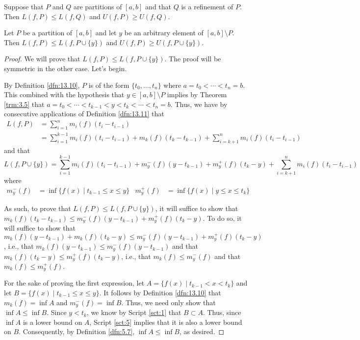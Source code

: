 \documentclass[../main.tex]{subfiles}
\begin{document}
\begin{lemma}\label{lem:13.12}
    Suppose that $P$ and $Q$ are partitions of $[a,b]$ and that $Q$ is a refinement of $P$. Then $L(f,P)\leq L(f,Q)$ and $U(f,P)\geq U(f,Q)$.
    \begin{lemma*}
        Let $P$ be a partition of $[a,b]$ and let $y$ be an arbitrary element of $[a,b]\setminus P$. Then $L(f,P)\leq L(f,P\cup\{y\})$ and $U(f,P)\geq U(f,P\cup\{y\})$.
        \begin{proof}
            We will prove that $L(f,P)\leq L(f,P\cup\{y\})$. The proof will be symmetric in the other case. Let's begin.\par
            By Definition \ref{dfn:13.10}, $P$ is of the form $\{t_0,\dots,t_n\}$ where $a=t_0<\cdots<t_n=b$. This combined with the hypothesis that $y\in[a,b]\setminus P$ implies by Theorem \ref{trm:3.5} that $a=t_0<\cdots<t_{k-1}<y<t_k<\cdots<t_n=b$. Thus, we have by consecutive applications of Definition \ref{dfn:13.11} that
            \begin{align*}
                L(f,P) &= \sum_{i=1}^nm_i(f)(t_i-t_{i-1})\\
                &= \sum_{i=1}^{k-1}m_i(f)(t_i-t_{i-1})+m_k(f)(t_k-t_{k-1})+\sum_{i=k+1}^nm_i(f)(t_i-t_{i-1})
            \end{align*}
            and that
            \begin{equation*}
                L(f,P\cup\{y\}) = \sum_{i=1}^{k-1}m_i(f)(t_i-t_{i-1})+m_y^-(f)(y-t_{k-1})+m_y^+(f)(t_k-y)+\sum_{i=k+1}^nm_i(f)(t_i-t_{i-1})
            \end{equation*}
            where
            \begin{align*}
                m_y^-(f) &= \inf\{f(x)\mid t_{k-1}\leq x\leq y\}&
                m_y^+(f) &= \inf\{f(x)\mid y\leq x\leq t_k\}
            \end{align*}\par
            As such, to prove that $L(f,P)\leq L(f,P\cup\{y\})$, it will suffice to show that $m_k(f)(t_k-t_{k-1})\leq m_y^-(f)(y-t_{k-1})+m_y^+(f)(t_k-y)$. To do so, it will suffice to show that $m_k(f)(y-t_{k-1})+m_k(f)(t_k-y)\leq m_y^-(f)(y-t_{k-1})+m_y^+(f)(t_k-y)$, i.e., that $m_k(f)(y-t_{k-1})\leq m_y^-(f)(y-t_{k-1})$ and that $m_k(f)(t_k-y)\leq m_y^+(f)(t_k-y)$, i.e., that $m_k(f)\leq m_y^-(f)$ and that $m_k(f)\leq m_y^+(f)$.\par
            For the sake of proving the first expression, let $A=\{f(x)\mid t_{k-1}<x<t_k\}$ and let $B=\{f(x)\mid t_{k-1}\leq x\leq y\}$. It follows by Definition \ref{dfn:13.10} that $m_k(f)=\inf A$ and $m_y^-(f)=\inf B$. Thus, we need only show that $\inf A\leq\inf B$. Since $y<t_k$, we know by Script \ref{sct:1} that $B\subset A$. Thus, since $\inf A$ is a lower bound on $A$, Script \ref{sct:5} implies that it is also a lower bound on $B$. Consequently, by Definition \ref{dfn:5.7}, $\inf A\leq\inf B$, as desired.\par

\end{proof}
\end{lemma*}
\end{lemma}
\end{document}
